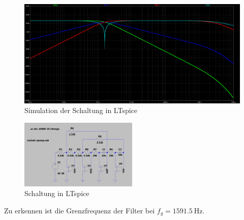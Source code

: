 \begin{figure}[H]
    \begin{center}
        \includegraphics[width=1\textwidth]{img/LTsim.png}
        \caption{Simulation der Schaltung in LTspice }
        \label{fig:V4_Sim}
    \end{center}
\end{figure}
\begin{figure}[H]
    \begin{center}
        \includegraphics[width=0.5\textwidth]{img/LTblock.PNG}
        \caption{Schaltung in LTspice}
        \label{fig:V4_Block}
    \end{center}
\end{figure}

Zu erkennen ist die Grenzfrequenz der Filter bei $f_g= \SI{1591.5}{\hertz}$.



